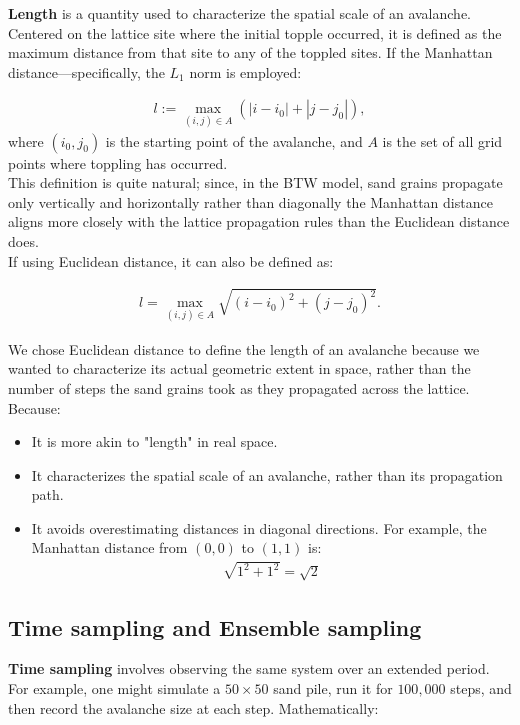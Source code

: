 \documentclass{article}
\begin{document}
\hspace{2mm}

\textbf{Length} is a quantity used to characterize the spatial scale of an avalanche. Centered on the lattice site where the initial topple occurred, it is defined as the maximum distance from that site to any of the toppled sites. If the Manhattan distance—specifically, the $L_1$ norm is employed:

\begin{align}
    l := \max_{(i,j) \in A}(|i-i_0|+|j-j_0|),
\end{align}
where $(i_0, j_0)$ is the starting point of the avalanche, and $A$ is the set of all grid points where toppling has occurred. \\

This definition is quite natural; since, in the BTW model, sand grains propagate only vertically and horizontally rather than diagonally the Manhattan distance aligns more closely with the lattice propagation rules than the Euclidean distance does. \\

If using Euclidean distance, it can also be defined as:

\begin{align}
    l = \max_{(i,j) \in A} \sqrt{(i-i_0)^2+(j-j_0)^2}.
\end{align}

We chose Euclidean distance to define the length of an avalanche because we wanted to characterize its actual geometric extent in space, rather than the number of steps the sand grains took as they propagated across the lattice. Because:

\begin{itemize}
    \item It is more akin to "length" in real space.
    \item It characterizes the spatial scale of an avalanche, rather than its propagation path.
    \item It avoids overestimating distances in diagonal directions. For example, the Manhattan distance from $(0,0)$ to $(1,1)$ is:
    \begin{align}
        \sqrt{1^2+1^2} = \sqrt{2}
    \end{align}
\end{itemize}

\subsection{Time sampling and Ensemble sampling}
\textbf{Time sampling} involves observing the same system over an extended period. For example, one might simulate a $50 \times 50$ sand pile, run it for $100,000$ steps, and then record the avalanche size at each step. Mathematically: 
\end{document}
